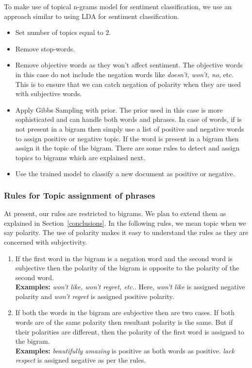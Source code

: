 To make use of topical n-grams model for sentiment classification, we use an approach similar to using LDA for sentiment classification.

\begin{itemize}
 \itemsep0em
 \item Set number of topics equal to 2.
 \item Remove stop-words.
 \item Remove objective words as they won't affect sentiment. The objective words in this case do not include the negation words like \textit{doesn't, 
 won't, no}, etc. This is to ensure that we can catch negation of polarity when they are used with subjective words.
 \item Apply Gibbs Sampling with prior. The prior used in this case is more sophisticated and can handle both words and phrases. In case of words, if
 is not present in a bigram then simply use a list of positive and negative words to assign positive or negative topic. If the word is present in a 
 bigram then assign it the topic of the bigram. There are some rules to detect and assign topics to bigrams which are explained next.
 \item Use the trained model to classify a new document as positive or negative.
\end{itemize}

\subsubsection*{Rules for Topic assignment of phrases}

At present, our rules are restricted to bigrams. We plan to extend them as explained in Section~\cref{conclusions}.
In the following rules, we mean topic when we say polarity. The use of polarity makes it easy to understand
the rules as they are concerned with subjectivity.

\begin{enumerate}
 \itemsep0em
 \item If the first word in the bigram is a negation word and the second word is subjective then the polarity
 of the bigram is opposite to the polarity of the second word. \\
 \textbf{Examples:} \textit{won't like, won't regret, etc.}. Here, \textit{won't like} is assigned negative
 polarity and \textit{won't regret} is assigned positive polarity.
 \item If both the words in the bigram are subjective then are two cases. If both words are of the same polarity
 then resultant polarity is the same. But if their polarities are different, then the polarity of the first word
 is assigned to the bigram. \\
 \textbf{Examples:} \textit{beautifully amazing} is positive as both words as positive. \textit{lack respect} is
 assigned negative as per the rules.
\end{enumerate}

